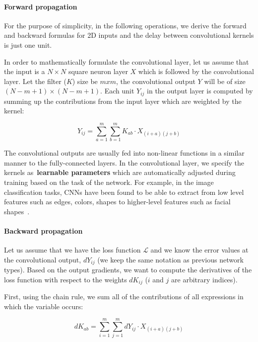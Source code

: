 \paragraph{Forward propagation} For the purpose of simplicity, in the following operations, we derive the forward and backward formulas for 2D inputs and the delay between convolutional kernels is just one unit. 

In order to mathematically formulate the convolutional layer, let us assume that the input is a $N \times N$ square neuron layer $X$ which is followed by the convolutional layer. Let the filter ($K$) size be $m x m$, the convolutional output $Y$ will be of size $(N - m + 1) \times (N - m + 1)$. Each unit $Y_{ij}$ in the output layer is computed by summing up the contributions from the input layer which are weighted by the kernel:

\begin{equation}
Y_{ij} = \sum_{a=1}^{m} \sum_{b=1}^{m} K_{ab} \cdot X_{(i+a)(j+b)}
\label{eq:convolution}
\end{equation}


The convolutional outputs are usually fed into non-linear functions in a similar manner to the fully-connected layers. In the convolutional layer, we specify the kernels as~\textbf{learnable parameters} which are automatically adjusted during training based on the task of the network.  For example, in the image classification tasks, CNNs have been found to be able to extract from low level features such as edges, colors, shapes to higher-level features such as facial shapes~\cite{krizhevsky2012imagenet}. 

\paragraph{Backward propagation} Let us assume that we have the loss function $\mathcal{L}$ and we know the error values at the convolutional output, $dY_{ij}$ (we keep the same notation as previous network types). Based on the output gradients, we want to compute the derivatives of the loss function with respect to the weights $dK_{ij}$ ($i$ and $j$ are arbitrary indices). 

First, using the chain rule, we sum all of the contributions of all expressions in which the variable occurs:

\begin{equation}
dK_{ab} = \sum_{i=1}^{m} \sum_{j=1}^{m} dY_{ij} \cdot  X_{(i+a)(j+b)}
\label{eq:dconv}
\end{equation}

